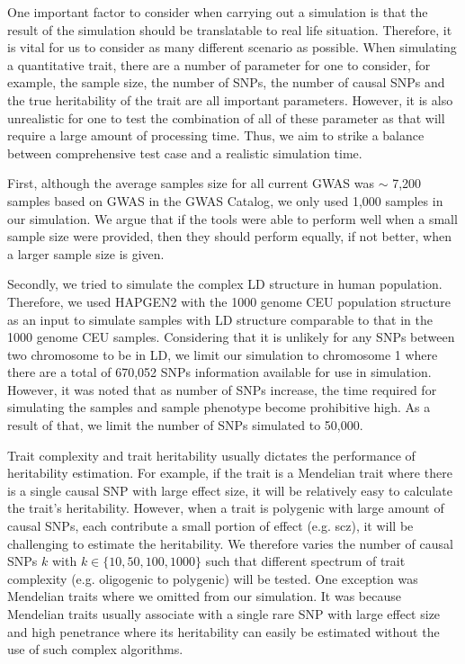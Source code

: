 			One important factor to consider when carrying out a simulation is that the result of the simulation should be translatable to real life situation. 
			Therefore, it is vital for us to consider as many different scenario as possible.
			When simulating a quantitative trait, there are a number of parameter for one to consider, for example, the sample size, the number of \glspl{SNP}, the number of causal \glspl{SNP} and the true heritability of the trait are all important parameters. 
			However, it is also unrealistic for one to test the combination of all of these parameter as that will require a large amount of processing time. 
			Thus, we aim to strike a balance between comprehensive test case and a realistic simulation time. 
			
			First, although the average samples size for all current \gls{GWAS} was $\sim$ 7,200 samples based on \gls{GWAS} in the \gls{GWAS} Catalog\citep{Welter2014}, we only used 1,000 samples in our simulation.
			We argue that if the tools were able to perform well when a small sample size were provided, then they should perform equally, if not better, when a larger sample size is given. 
			
			Secondly, we tried to simulate the complex \gls{LD} structure in human population.
			Therefore, we used HAPGEN2\citep{Su2011} with the 1000 genome \gls{CEU} population structure as an input to simulate samples with \gls{LD} structure comparable to that in the 1000 genome \gls{CEU} samples.
			Considering that it is unlikely for any \glspl{SNP} between two chromosome to be in \gls{LD}, we limit our simulation to chromosome 1 where there are a total of 670,052 \glspl{SNP} information available for use in simulation.
			However, it was noted that as number of \glspl{SNP} increase, the time required for simulating the samples and sample phenotype become prohibitive high. 
			As a result of that, we limit the number of \glspl{SNP} simulated to 50,000. 
			
			Trait complexity and trait heritability usually dictates the performance of heritability estimation.
			For example, if the trait is a Mendelian trait where there is a single causal \gls{SNP} with large effect size, it will be relatively easy to calculate the trait's heritability.
			However, when a trait is polygenic with large amount of causal \glspl{SNP}, each contribute a small portion of effect (e.g. \gls{scz}), it will be challenging to estimate the heritability.
			We therefore varies the number of causal \glspl{SNP} $k$ with $k\in\{10,50,100,1000\}$ such that different spectrum of trait complexity (e.g. oligogenic to polygenic) will be tested. 
			One exception was Mendelian traits where we omitted from our simulation.
			It was because Mendelian traits usually associate with a single rare \gls{SNP} with large effect size and high penetrance where its heritability can easily be estimated without the use of such complex algorithms.
			
